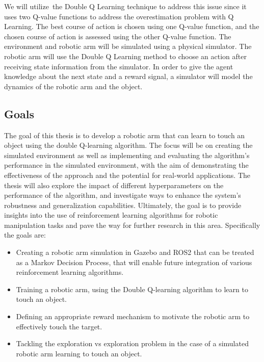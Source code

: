 \documentclass[12pt,oneside]{article}
\begin{document}
We will utilize the Double Q Learning technique to address this issue since it uses two Q-value functions to address the overestimation problem with Q Learning. The best course of action is chosen using one Q-value function, and the chosen course of action is assessed using the other Q-value function. The environment and robotic arm will be simulated using a physical simulator. The robotic arm will use the Double Q Learning method to choose an action after receiving state information from the simulator. In order to give the agent knowledge about the next state and a reward signal, a simulator will model the dynamics of the robotic arm and the object.

%
\subsection{Goals}\label{sec:ziele}
The goal of this thesis is to develop a robotic arm that can learn to touch an object using the double Q-learning algorithm. The focus will be on creating the simulated environment as well as implementing and evaluating the algorithm's performance in the simulated environment, with the aim of demonstrating the effectiveness of the approach and the potential for real-world applications. The thesis will also explore the impact of different hyperparameters on the performance of the algorithm, and investigate ways to enhance the system's robustness and generalization capabilities. Ultimately, the goal is to provide insights into the use of reinforcement learning algorithms for robotic manipulation tasks and pave the way for further research in this area. Specifically the goals are:

\begin{itemize}
\item Creating a robotic arm simulation in Gazebo and ROS2 that can be treated as a Markov Decision Process, that will enable future integration of various reinforcement learning algorithms.
\item Training a robotic arm, using the Double Q-learning algorithm to learn to touch an object.
\item Defining an appropriate reward mechanism to motivate the robotic arm to effectively touch the target.
\item Tackling the exploration vs exploration problem in the case of a simulated robotic arm learning to touch an object.

\end{itemize}
\end{document}
